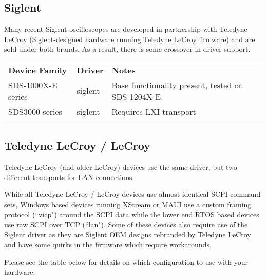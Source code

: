 \subsection{Siglent}

Many recent Siglent oscilloscopes are developed in partnership with Teledyne LeCroy (Siglent-designed hardware running
Teledyne LeCroy firmware) and are sold under both brands. As a result, there is some crossover in driver support. \\

\begin{tabularx}{16cm}{llX}
\thickhline
\textbf{Device Family} & \textbf{Driver} & \textbf{Notes} \\
\thickhline
SDS-1000X-E series & siglent & Base functionality present, tested on SDS-1204X-E.\\
\thickhline
SDS3000 series & siglent & Requires LXI transport \\
\thickhline
\end{tabularx}

\subsection{Teledyne LeCroy / LeCroy}

Teledyne LeCroy (and older LeCroy) devices use the same driver, but two different transports for LAN connections.

While all Teledyne LeCroy / LeCroy devices use almost identical SCPI command sets, Windows based devices running
XStream or MAUI use a custom framing protocol (``vicp") around the SCPI data while the lower end RTOS based devices use
raw SCPI over TCP (``lan"). Some of these devices also require use of the Siglent driver as they are Siglent OEM
designs rebranded by Teledyne LeCroy and have some quirks in the firmware which require workarounds.

Please see the table below for details on which configuration to use with  your hardware.

